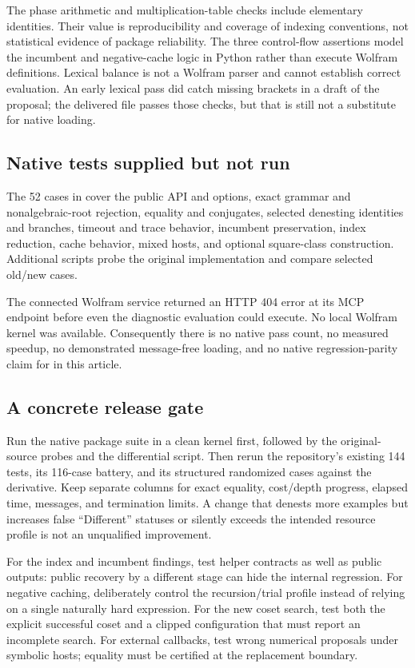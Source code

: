 \documentclass[11pt,letterpaper]{article}
\numberwithin{equation}{section}
\theoremstyle{definition}\newtheorem{definition}[theorem]{Definition}
\theoremstyle{remark}\newtheorem{remark}[theorem]{Remark}
\newcommand{\code}[1]{\texttt{\detokenize{#1}}}
\begin{document}
The phase arithmetic and multiplication-table checks include elementary identities. Their value is reproducibility and coverage of indexing conventions, not statistical evidence of package reliability. The three control-flow assertions model the incumbent and negative-cache logic in Python rather than execute Wolfram definitions. Lexical balance is not a Wolfram parser and cannot establish correct evaluation. An early lexical pass did catch missing brackets in a draft of the proposal; the delivered file passes those checks, but that is still not a substitute for native loading.

\subsection{Native tests supplied but not run}
The 52 \code{VerificationTest} cases in \code{tests/StradFixed3.wlt} cover the public API and options, exact grammar and nonalgebraic-root rejection, equality and conjugates, selected denesting identities and branches, timeout and trace behavior, incumbent preservation, index reduction, cache behavior, mixed hosts, and optional square-class construction. Additional scripts probe the original implementation and compare selected old/new cases.

The connected Wolfram service returned an HTTP 404 error at its MCP endpoint before even the diagnostic evaluation could execute. No local Wolfram kernel was available. Consequently there is no native pass count, no measured speedup, no demonstrated message-free loading, and no native regression-parity claim for \code{StradFixed3.wl} in this article.

\subsection{A concrete release gate}
Run the native package suite in a clean kernel first, followed by the original-source probes and the differential script. Then rerun the repository's existing 144 tests, its 116-case battery, and its structured randomized cases against the derivative. Keep separate columns for exact equality, cost/depth progress, elapsed time, messages, and termination limits. A change that denests more examples but increases false ``Different'' statuses or silently exceeds the intended resource profile is not an unqualified improvement.

For the index and incumbent findings, test helper contracts as well as public outputs: public recovery by a different stage can hide the internal regression. For negative caching, deliberately control the recursion/trial profile instead of relying on a single naturally hard expression. For the new coset search, test both the explicit successful coset and a clipped configuration that must report an incomplete search. For external callbacks, test wrong numerical proposals under symbolic hosts; equality must be certified at the replacement boundary.
\end{document}
